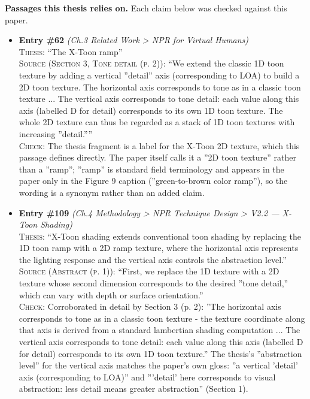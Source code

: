 \documentclass[11pt, a4paper]{article}
\begin{document}
\textbf{Passages this thesis relies on.} Each claim below was checked against this paper.
\begin{itemize}[leftmargin=1.2em,itemsep=4pt]
\item \textbf{Entry \#62} \textit{(Ch.3 Related Work > NPR for Virtual Humans)}\\
\textsc{Thesis:} ``The X-Toon ramp''\\
\textsc{Source (Section 3, Tone detail (p. 2)):} ``We extend the classic 1D toon texture by adding a vertical ”detail” axis (corresponding to LOA) to build a 2D toon texture. The horizontal axis corresponds to tone as in a classic toon texture ... The vertical axis corresponds to tone detail: each value along this axis (labelled D for detail) corresponds to its own 1D toon texture. The whole 2D texture can thus be regarded as a stack of 1D toon textures with increasing ”detail.”''\\
\textsc{Check:} The thesis fragment is a label for the X-Toon 2D texture, which this passage defines directly. The paper itself calls it a ”2D toon texture” rather than a ”ramp”; ”ramp” is standard field terminology and appears in the paper only in the Figure 9 caption (”green-to-brown color ramp”), so the wording is a synonym rather than an added claim.
\item \textbf{Entry \#109} \textit{(Ch.4 Methodology > NPR Technique Design > V2.2 — X-Toon Shading)}\\
\textsc{Thesis:} ``X-Toon shading extends conventional toon shading by replacing the 1D toon ramp with a 2D ramp texture, where the horizontal axis represents the lighting response and the vertical axis controls the abstraction level.''\\
\textsc{Source (Abstract (p. 1)):} ``First, we replace the 1D texture with a 2D texture whose second dimension corresponds to the desired ”tone detail,” which can vary with depth or surface orientation.''\\
\textsc{Check:} Corroborated in detail by Section 3 (p. 2): ”The horizontal axis corresponds to tone as in a classic toon texture - the texture coordinate along that axis is derived from a standard lambertian shading computation ... The vertical axis corresponds to tone detail: each value along this axis (labelled D for detail) corresponds to its own 1D toon texture.” The thesis's ”abstraction level” for the vertical axis matches the paper's own gloss: ”a vertical 'detail' axis (corresponding to LOA)” and ”'detail' here corresponds to visual abstraction: less detail means greater abstraction” (Section 1).

\end{itemize}
\end{document}

